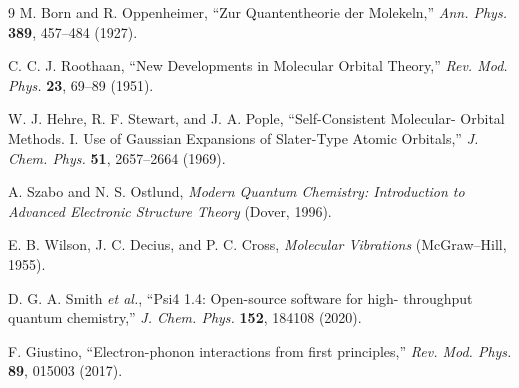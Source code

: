 \documentclass[10pt,twocolumn]{article}
\begin{document}
\begin{thebibliography}{9}
M. Born and R. Oppenheimer, ``Zur Quantentheorie der Molekeln,''
\emph{Ann. Phys.} \textbf{389}, 457--484 (1927).

C. C. J. Roothaan, ``New Developments in Molecular Orbital Theory,''
\emph{Rev. Mod. Phys.} \textbf{23}, 69--89 (1951).

W. J. Hehre, R. F. Stewart, and J. A. Pople, ``Self-Consistent Molecular-
Orbital Methods. I. Use of Gaussian Expansions of Slater-Type Atomic
Orbitals,'' \emph{J. Chem. Phys.} \textbf{51}, 2657--2664 (1969).

A. Szabo and N. S. Ostlund, \emph{Modern Quantum Chemistry: Introduction to
Advanced Electronic Structure Theory} (Dover, 1996).

E. B. Wilson, J. C. Decius, and P. C. Cross, \emph{Molecular Vibrations}
(McGraw--Hill, 1955).

D. G. A. Smith \emph{et al.}, ``Psi4 1.4: Open-source software for high-
throughput quantum chemistry,'' \emph{J. Chem. Phys.} \textbf{152}, 184108
(2020).

F. Giustino, ``Electron-phonon interactions from first principles,''
\emph{Rev. Mod. Phys.} \textbf{89}, 015003 (2017).

\end{thebibliography}
\end{document}
